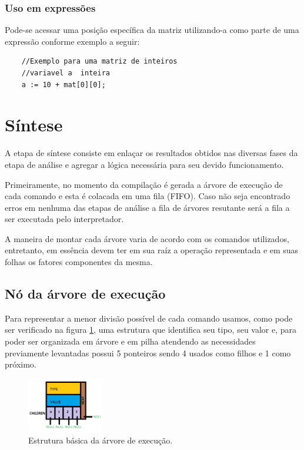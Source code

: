 \documentclass[a4paper,12pt]{report}
\begin{document}
\subsubsection{Uso em express\~oes}

Pode-se acessar uma posi\c{c}\~ao espec\'ifica da matriz
utilizando-a como parte de uma express\~ao conforme exemplo a seguir:

\begin{verbatim}
	//Exemplo para uma matriz de inteiros
    //variavel a  inteira
	a := 10 + mat[0][0];
\end{verbatim}


\section{S\'intese}

A etapa de s\'intese consiste em enla\c{c}ar os resultados obtidos nas diversas fases da etapa
de an\'alise e agregar a l\'ogica necess\'aria para seu devido funcionamento.

Primeiramente, no momento da compila\c{c}\~ao \'e gerada a \'arvore de execu\c{c}\~ao de cada comando e esta \'e colacada em uma fila (FIFO). Caso não seja encontrado erros em nenhuma das etapas de an\'alise a fila de \'arvores resutante ser\'a a fila a ser executada pelo interpretador.

A maneira de montar cada \'arvore varia de acordo com os comandos utilizados, entretanto, em ess\^encia devem ter em sua ra\'iz a opera\c{c}\~ao representada e em suas folhas os fatores componentes da mesma.

\subsection{N\'o da \'arvore de execu\c{c}\~ao}

Para representar a menor divis\~ao poss\'ivel de cada comando usamos, como pode ser verificado na figura \ref{fig:No}, uma estrutura que identifica seu tipo, seu valor e, para poder ser organizada em \'arvore e em pilha atendendo as necessidades previamente levantadas possui 5 ponteiros sendo 4 usados como filhos e 1 como pr\'oximo.

\begin{figure}
\centering
\includegraphics[width=0.3\textwidth]{imgs/Estrutura_b_sica.png}
\caption{\label{fig:No}Estrutura b\'asica da \'arvore de execu\c{c}\~ao.}
\end{figure}
\end{document}
